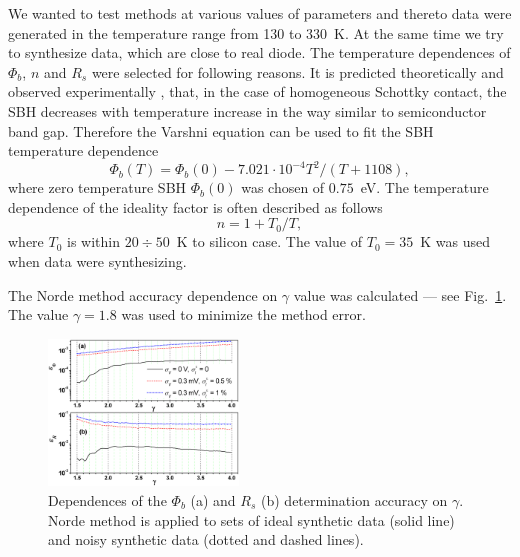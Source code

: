 \documentclass[aip,jap,reprint]{revtex4-1}
\begin{document}
We wanted to test methods at various values of parameters and thereto data were generated in the temperature range from 130 to 330~K.
At the same time we try to synthesize data, which are close to real diode.
The temperature dependences of $\Phi_b$, $n$ and $R_s$ were selected for following reasons.
It is predicted theoretically \cite{Rhoderick1988} and observed
experimentally \cite{Aboelfotoh,Zhua}, that, in the case of homogeneous Schottky contact, the SBH decreases with temperature increase in the way similar to semiconductor band gap.
Therefore the Varshni equation \cite{SiEg2012} can be used to fit the SBH temperature dependence
\begin{equation}
\label{eqFbT}
\Phi_b(T) = \Phi_b(0) - 7.021\cdot10^{-4} T^2 /(T + 1108),
\end{equation}
where zero temperature SBH $\Phi_b(0)$ was chosen of $0.75$~eV.
The temperature dependence of the ideality factor is often described as follows
\begin{equation}
\label{eqnT}
n=1+T_0/T,
\end{equation}
where $T_0$ is within $20\div50$~K to silicon case.\cite{T0:Lee,T0:McCafferty,T0:Saxena,Aboelfotoh}
The value of $T_0=35$~K was used when data were synthesizing.

The Norde method accuracy dependence on $\gamma$ value was calculated --- see Fig.~\ref{figNorde}.
The value $\gamma=1.8$ was used to minimize the method error.

\begin{figure}
\includegraphics[width=0.45\textwidth]{fig_1}%
\caption{\label{figNorde}
Dependences of the $\Phi_b$ (a) and $R_s$ (b) determination accuracy on $\gamma$.
Norde method is applied to sets of ideal synthetic data (solid line) and noisy synthetic data (dotted and dashed lines).
}
\end{figure}
\end{document}
